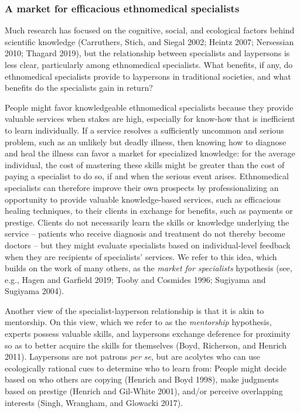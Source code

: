 \documentclass[
  11pt,
]{article}
\begin{document}
\hypertarget{a-market-for-efficacious-ethnomedical-specialists}{%
\subsubsection{A market for efficacious ethnomedical specialists}\label{a-market-for-efficacious-ethnomedical-specialists}}

Much research has focused on the cognitive, social, and ecological factors behind scientific knowledge (Carruthers, Stich, and Siegal 2002; Heintz 2007; Nersessian 2010; Thagard 2019), but the relationship between specialists and laypersons is less clear, particularly among ethnomedical specialists. What benefits, if any, do ethnomedical specialists provide to laypersons in traditional societies, and what benefits do the specialists gain in return?

People might favor knowledgeable ethnomedical specialists because they provide valuable services when stakes are high, especially for know-how that is inefficient to learn individually. If a service resolves a sufficiently uncommon and serious problem, such as an unlikely but deadly illness, then knowing how to diagnose and heal the illness can favor a market for specialized knowledge: for the average individual, the cost of mastering these skills might be greater than the cost of paying a specialist to do so, if and when the serious event arises. Ethnomedical specialists can therefore improve their own prospects by professionalizing an opportunity to provide valuable knowledge-based services, such as efficacious healing techniques, to their clients in exchange for benefits, such as payments or prestige. Clients do not necessarily learn the skills or knowledge underlying the service -- patients who receive diagnosis and treatment do not thereby become doctors -- but they might evaluate specialists based on individual-level feedback when they are recipients of specialists' services. We refer to this idea, which builds on the work of many others, as the \emph{market for specialists} hypothesis (see, e.g., Hagen and Garfield 2019; Tooby and Cosmides 1996; Sugiyama and Sugiyama 2004).

Another view of the specialist-layperson relationship is that it is akin to mentorship. On this view, which we refer to as the \emph{mentorship} hypothesis, experts possess valuable skills, and laypersons exchange deference for proximity so as to better acquire the skills for themselves (Boyd, Richerson, and Henrich 2011). Laypersons are not patrons \emph{per se}, but are acolytes who can use ecologically rational cues to determine who to learn from: People might decide based on who others are copying (Henrich and Boyd 1998), make judgments based on prestige (Henrich and Gil-White 2001), and/or perceive overlapping interests (Singh, Wrangham, and Glowacki 2017).
\end{document}
